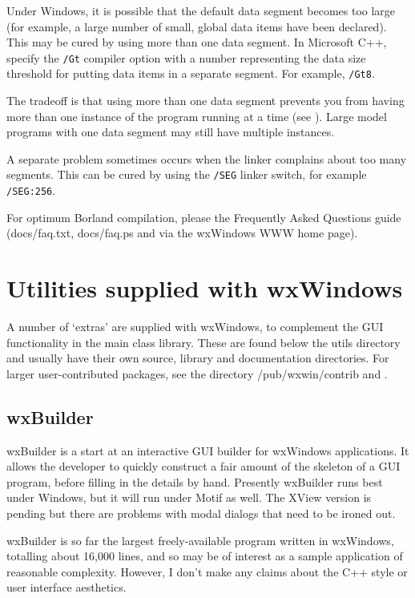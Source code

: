 Under Windows, it is possible that the default data segment becomes
too large (for example, a large number of small, global data items
have been declared). This may be cured by using more than one data
segment. In Microsoft C++, specify the {\tt /Gt} compiler option with
a number representing the data size threshold for putting data items
in a separate segment. For example, {\tt /Gt8}.

The tradeoff is that using more than one data segment prevents you from
having more than one instance of the program running at a time
(see ). Large model programs with one
data segment may still have multiple instances.

A separate problem sometimes occurs when the linker complains about too
many segments. This can be cured by using the {\tt /SEG} linker switch,
for example {\tt /SEG:256}.

For optimum Borland compilation, please the Frequently Asked
Questions guide (docs/faq.txt, docs/faq.ps and via the
wxWindows WWW home page).

\chapter{Utilities supplied with wxWindows}\label{utilities}
%
\setfooter{\thepage}{}{}{}{}{\thepage}%

A number of `extras' are supplied with wxWindows, to complement
the GUI functionality in the main class library. These are found
below the utils directory and usually have their own source, library
and documentation directories. For larger user-contributed packages,
see the directory /pub/wxwin/contrib and .

\section{wxBuilder}\label{wxbuilder}

wxBuilder is a start at an interactive GUI builder for wxWindows
applications. It allows the developer to quickly construct a fair amount
of the skeleton of a GUI program, before filling in the details by hand.
Presently wxBuilder runs best under Windows, but it will run under
Motif as well. The XView version is pending but there are problems
with modal dialogs that need to be ironed out.

wxBuilder is so far the largest freely-available program written in
wxWindows, totalling about 16,000 lines, and so may be of interest as a
sample application of reasonable complexity. However, I don't make any
claims about the C++ style or user interface aesthetics.

